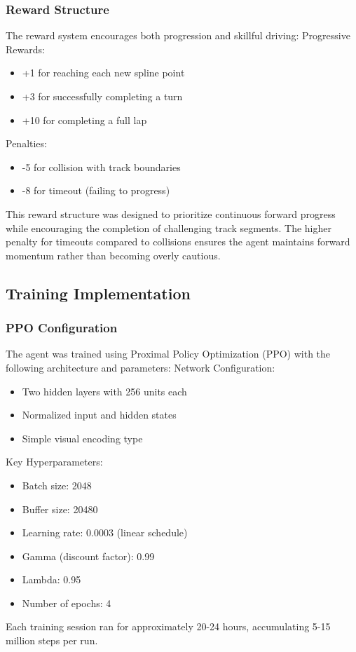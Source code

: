 \documentclass[10pt,twocolumn]{article}
\begin{document}
\subsubsection{Reward Structure}
The reward system encourages both progression and skillful driving:
Progressive Rewards:
\begin{itemize}
    \item +1 for reaching each new spline point
    \item +3 for successfully completing a turn
    \item +10 for completing a full lap
\end{itemize}
Penalties:
\begin{itemize}
    \item -5 for collision with track boundaries
    \item -8 for timeout (failing to progress)
\end{itemize}
This reward structure was designed to prioritize continuous forward progress while encouraging the completion of challenging track segments. The higher penalty for timeouts compared to collisions ensures the agent maintains forward momentum rather than becoming overly cautious.

\subsection{Training Implementation}
\subsubsection{PPO Configuration}
The agent was trained using Proximal Policy Optimization (PPO) with the following architecture and parameters:
Network Configuration:
\begin{itemize}
    \item Two hidden layers with 256 units each
    \item Normalized input and hidden states
    \item Simple visual encoding type
\end{itemize}
Key Hyperparameters:
\begin{itemize}
    \item Batch size: 2048
    \item Buffer size: 20480
    \item Learning rate: 0.0003 (linear schedule)
    \item Gamma (discount factor): 0.99
    \item Lambda: 0.95
    \item Number of epochs: 4
\end{itemize}
Each training session ran for approximately 20-24 hours, accumulating 5-15 million steps per run.
\end{document}
